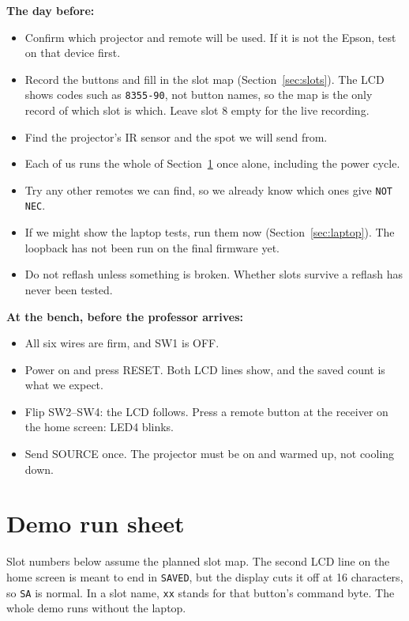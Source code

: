 \documentclass[11pt,a4paper]{article}
\newcommand{\code}[1]{\texttt{#1}}
\begin{document}
\textbf{The day before:}
\begin{itemize}[label=$\square$]
\item Confirm which projector and remote will be used. If it is not the Epson, test on that device first.
\item Record the buttons and fill in the slot map (Section~\ref{sec:slots}). The LCD shows codes such as \code{8355-90}, not button names, so the map is the only record of which slot is which. Leave slot 8 empty for the live recording.
\item Find the projector's IR sensor and the spot we will send from.
\item Each of us runs the whole of Section~\ref{sec:demo} once alone, including the power cycle.
\item Try any other remotes we can find, so we already know which ones give \code{NOT NEC}.
\item If we might show the laptop tests, run them now (Section~\ref{sec:laptop}). The loopback has not been run on the final firmware yet.
\item Do not reflash unless something is broken. Whether slots survive a reflash has never been tested.
\end{itemize}

\textbf{At the bench, before the professor arrives:}
\begin{itemize}[label=$\square$]
\item All six wires are firm, and SW1 is OFF.
\item Power on and press RESET. Both LCD lines show, and the saved count is what we expect.
\item Flip SW2--SW4: the LCD follows. Press a remote button at the receiver on the home screen: LED4 blinks.
\item Send SOURCE once. The projector must be on and warmed up, not cooling down.
\end{itemize}

\newpage
\section{Demo run sheet}
\label{sec:demo}

Slot numbers below assume the planned slot map. The second LCD line on the home screen is meant to end in \code{SAVED}, but the display cuts it off at 16 characters, so \code{SA} is normal. In a slot name, \code{xx} stands for that button's command byte. The whole demo runs without the laptop.
\end{document}
